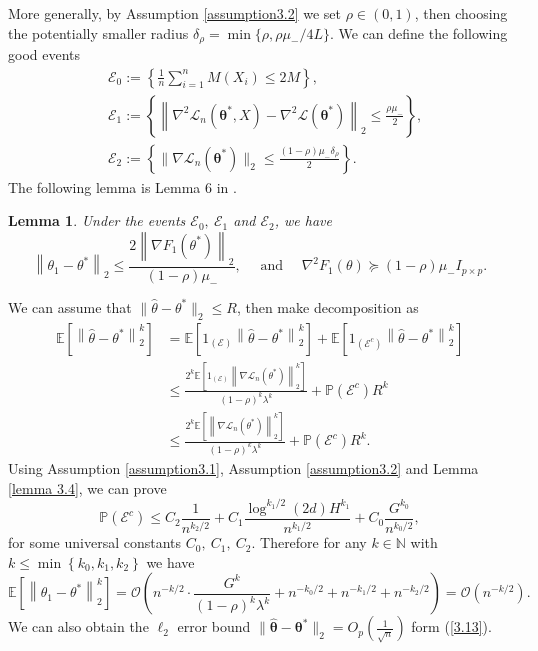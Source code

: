 \documentclass[12pt]{article}
\numberwithin{equation}{section}
\newtheorem{lemma}[theorem]{Lemma}
\begin{document}
More generally, by Assumption \ref{assumption3.2} we set $\rho \in (0,1)$, then choosing the potentially smaller radius $\delta_{\rho}=\min \{\rho, \rho \mu_{-} / 4 L\}$. We can define the following good events
\begin{align*}
&\mathcal{E}_{0}:=\left\{\frac{1}{n} \sum_{i=1}^{n} M\left(X_{i}\right) \leq 2 M\right\},\\
&\mathcal{E}_{1}:=\left\{\left\|\nabla^{2} \mathcal{L}_n\left(\boldsymbol{\theta}^{*},X\right)-\nabla^{2} \mathcal{L}\left(\boldsymbol{\theta}^{*}\right)\right\|_{2} \leq \frac{\rho\mu_{-}}{2}\right\},\\
&\mathcal{E}_2:=\left\{\|\nabla\mathcal{L}_n\left(\boldsymbol{\theta}^{*}\right)\|_2\leq \frac{(1-\rho) \mu_{-} \delta_{\rho}}{2}\right\}.
\end{align*}
The following lemma is Lemma 6 in \citet{zhang2013communication}.
\begin{lemma}\label{lemma3.7}
	Under the events $\mathcal{E}_0,\ \mathcal{E}_1$ and $\mathcal{E}_2$, we have
	\begin{equation}
	\left\|\theta_{1}-\theta^{*}\right\|_{2} \leq \frac{2\left\|\nabla F_{1}\left(\theta^{*}\right)\right\|_{2}}{(1-\rho) \mu_{-}}, \quad \text { and } \quad \nabla^{2} F_{1}(\theta) \succeq(1-\rho) \mu_{-} I_{p \times p}.
	\end{equation}
\end{lemma}
We can assume that $\|\hat \theta-\theta^{*}\|_2\leq R$, then make decomposition as
\begin{align*}
\mathbb{E}\left[\left\|\hat\theta-\theta^{*}\right\|_{2}^{k}\right] &=\mathbb{E}\left[1_{(\mathcal{E})}\left\|\hat\theta-\theta^{*}\right\|_{2}^{k}\right]+\mathbb{E}\left[1_{\left(\mathcal{E}^{c}\right)}\left\|\hat\theta-\theta^{*}\right\|_{2}^{k}\right] \\
& \leq \frac{2^{k} \mathbb{E}\left[1_{(\mathcal{E})}\left\|\nabla \mathcal{L}_n\left(\theta^{*}\right)\right\|_{2}^{k}\right]}{(1-\rho)^{k} \lambda^{k}}+\mathbb{P}\left(\mathcal{E}^{c}\right) R^{k} \\
& \leq \frac{2^{k} \mathbb{E}\left[\left\|\nabla \mathcal{L}_n\left(\theta^{*}\right)\right\|_{2}^{k}\right]}{(1-\rho)^{k} \lambda^{k}}+\mathbb{P}\left(\mathcal{E}^{c}\right) R^{k}.
\end{align*}
Using Assumption \ref{assumption3.1}, Assumption \ref{assumption3.2} and Lemma \ref{lemma 3.4}, we can prove
$$
\mathbb{P}\left(\mathcal{E}^{c}\right)\leq C_{2} \frac{1}{n^{k_{2} / 2}}+C_{1} \frac{\log ^{k_{1} / 2}(2 d) H^{k_{1}}}{n^{k_{1} / 2}}+C_{0} \frac{G^{k_{0}}}{n^{k_{0} / 2}},
$$
for some universal constants $C_0,\ C_1,\ C_2$. Therefore for any $k\in \mathbb{N}$ with $k \leq \min \left\{k_{0}, k_{1}, k_{2}\right\}$ we have
\begin{equation}\label{3.13}
\mathbb{E}\left[\left\|\theta_{1}-\theta^{*}\right\|_{2}^{k}\right]=\mathcal{O}\left(n^{-k / 2} \cdot \frac{G^{k}}{(1-\rho)^{k} \lambda^{k}}+n^{-k_{0} / 2}+n^{-k_{1} / 2}+n^{-k_{2} / 2}\right)=\mathcal{O}\left(n^{-k / 2}\right).
\end{equation}
We can also obtain the $\ell_2$ error bound $\|\widehat{\boldsymbol{\theta}}-\boldsymbol{\theta}^{*}\|_2=O_p\left(\frac{1}{\sqrt{n}}\right)$ form (\ref{3.13}).

\end{document}
